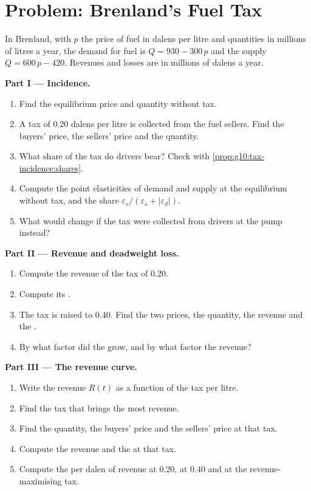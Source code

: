 \section{Problem: Brenland's Fuel Tax}

\begin{problem}
\label{pb:g10:tax-incidence:1}
In Brenland, with $p$ the price of fuel in dalens per litre and quantities in millions of litres a year, the demand for fuel is $Q = 930 - 300\,p$ and the supply $Q = 600\,p - 420$.
Revenues and losses are in millions of dalens a year.

\medskip
\noindent\textbf{Part I --- Incidence.}
\begin{enumerate}
\item Find the equilibrium price and quantity without tax.
\item A tax of 0.20 dalens per litre is collected from the fuel sellers. Find the buyers' price, the sellers' price and the quantity.
\item What share of the tax do drivers bear? Check with \cref{prop:g10:tax-incidence:shares}.
\item Compute the point elasticities of demand and supply at the equilibrium without tax, and the share $\varepsilon_s/(\varepsilon_s + |\varepsilon_d|)$.
\item What would change if the tax were collected from drivers at the pump instead?
\end{enumerate}

\medskip
\noindent\textbf{Part II --- Revenue and deadweight loss.}
\begin{enumerate}[resume]
\item Compute the revenue of the tax of 0.20.
\item Compute its .
\item The tax is raised to 0.40. Find the two prices, the quantity, the revenue and the .
\item By what factor did the  grow, and by what factor the revenue?
\end{enumerate}

\medskip
\noindent\textbf{Part III --- The revenue curve.}
\begin{enumerate}[resume]
\item Write the revenue $R(t)$ as a function of the tax per litre.
\item Find the tax that brings the most revenue.
\item Find the quantity, the buyers' price and the sellers' price at that tax.
\item Compute the revenue and the  at that tax.
\item Compute the  per dalen of revenue at 0.20, at 0.40 and at the revenue-maximising tax.
\end{enumerate}


\end{problem}
